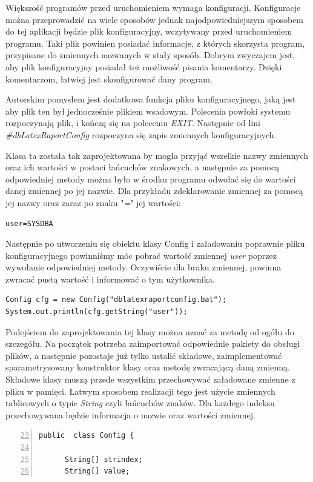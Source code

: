 Większość programów przed uruchomieniem wymaga konfiguracji. Konfiguracje można przeprowadzić na wiele sposobów jednak najodpowiedniejszym sposobem do tej aplikacji będzie plik konfiguracyjny, wczytywany przed uruchomieniem programu. Taki plik powinien posiadać informacje, z których skorzysta program, przypisane do zmiennych nazwanych w stały sposób.  Dobrym zwyczajem jest, aby plik konfiguracyjny posiadał też możliwość pisania komentarzy. Dzięki komentarzom, łatwiej jest skonfigurować dany program.
\par
Autorskim pomysłem jest dodatkowa funkcja pliku konfiguracyjnego, jaką jest aby plik ten był jednocześnie plikiem wsadowym. Polecenia powłoki systemu rozpoczynają plik, i kończą się na poleceniu \emph{EXIT}. Następnie od lini \emph{\#dbLatexRaportConfig} rozpoczyna się zapis zmiennych konfiguracyjnych.
\par
Klasa ta została tak zaprojektowana by mogła przyjąć wszelkie nazwy zmiennych oraz ich wartości w postaci łańcuchów znakowych, a następnie za pomocą odpowiedniej metody można było w środku programu odwołać się do wartości danej zmiennej po jej nazwie. Dla przykładu zdeklarowanie zmiennej za pomocą jej nazwy oraz zaraz po znaku "\emph{=}"  jej wartości:
\begin{lstlisting}
user=SYSDBA
\end{lstlisting}
Następnie po utworzeniu się obiektu klasy Config i załadowaniu poprawnie pliku konfiguracyjnego powinniśmy móc pobrać wartość  zmiennej \emph{user} poprzez wywołanie odpowiedniej metody. Oczywiście dla braku zmiennej, powinna zwracać pustą wartość i informować o tym użytkownika.
\begin{lstlisting}
Config cfg = new Config("dblatexraportconfig.bat");
System.out.println(cfg.getString("user"));
\end{lstlisting}

Podejściem do zaprojektowania tej klasy można uznać za metodę od ogółu do szczegółu. Na początek potrzeba zaimportować odpowiednie pakiety do obsługi plików, a następnie pozostaje już tylko ustalić składowe, zaimplementować sparametryzowany konstruktor klasy oraz metodę zwracającą daną zmienną. Składowe klasy muszą przede wszystkim przechowywać załadowane zmienne z pliku w pamięci. Łatwym sposobem realizacji tego jest użycie zmiennych tablicowych o typie \emph{String} czyli łańcuchów znaków. Dla każdego indeksu przechowywana będzie informacja o nazwie oraz wartości zmiennej. 
\begin{lstlisting}[numbers=left,firstnumber=23]
public  class Config {

      String[] strindex;
      String[] value; 
\end{lstlisting}

